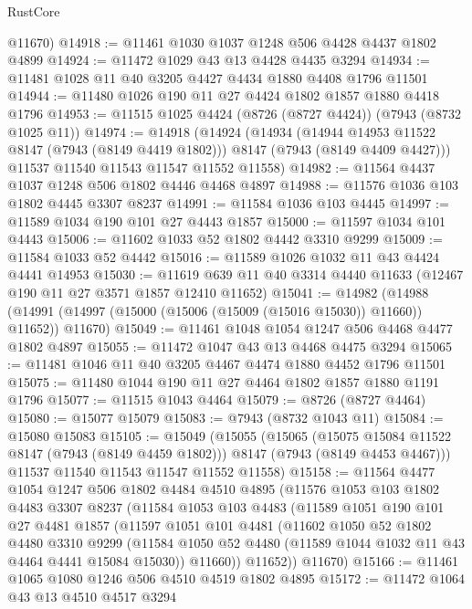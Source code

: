 \begin{lexlean}{RustCore}
\begin{coremodule}
      @11670)
@14918 := @11461 @1030 @1037 @1248 @506 @4428 @4437 @1802 @4899
@14924 := @11472 @1029 @43 @13 @4428 @4435 @3294
@14934 := @11481 @1028 @11 @40 @3205 @4427 @4434 @1880 @4408 @1796 @11501
@14944 := @11480 @1026 @190 @11 @27 @4424 @1802 @1857 @1880 @4418 @1796
@14953 := @11515 @1025 @4424 (@8726 (@8727 @4424)) (@7943 (@8732 @1025 @11))
@14974 := @14918
    (@14924
      (@14934
        (@14944 @14953 @11522 @8147 (@7943 (@8149 @4419 @1802)))
        @8147
        (@7943 (@8149 @4409 @4427)))
      @11537
      @11540
      @11543
      @11547
      @11552
      @11558)
@14982 := @11564 @4437 @1037 @1248 @506 @1802 @4446 @4468 @4897
@14988 := @11576 @1036 @103 @1802 @4445 @3307 @8237
@14991 := @11584 @1036 @103 @4445
@14997 := @11589 @1034 @190 @101 @27 @4443 @1857
@15000 := @11597 @1034 @101 @4443
@15006 := @11602 @1033 @52 @1802 @4442 @3310 @9299
@15009 := @11584 @1033 @52 @4442
@15016 := @11589 @1026 @1032 @11 @43 @4424 @4441 @14953
@15030 := @11619 @639 @11 @40 @3314 @4440 @11633 (@12467 @190 @11 @27 @3571 @1857 @12410 @11652)
@15041 := @14982
    (@14988 (@14991 (@14997 (@15000 (@15006 (@15009 (@15016 @15030)) @11660)) @11652)) @11670)
@15049 := @11461 @1048 @1054 @1247 @506 @4468 @4477 @1802 @4897
@15055 := @11472 @1047 @43 @13 @4468 @4475 @3294
@15065 := @11481 @1046 @11 @40 @3205 @4467 @4474 @1880 @4452 @1796 @11501
@15075 := @11480 @1044 @190 @11 @27 @4464 @1802 @1857 @1880 @1191 @1796
@15077 := @11515 @1043 @4464
@15079 := @8726 (@8727 @4464)
@15080 := @15077 @15079
@15083 := @7943 (@8732 @1043 @11)
@15084 := @15080 @15083
@15105 := @15049
    (@15055
      (@15065
        (@15075 @15084 @11522 @8147 (@7943 (@8149 @4459 @1802)))
        @8147
        (@7943 (@8149 @4453 @4467)))
      @11537
      @11540
      @11543
      @11547
      @11552
      @11558)
@15158 := @11564
    @4477
    @1054
    @1247
    @506
    @1802
    @4484
    @4510
    @4895
    (@11576
      @1053
      @103
      @1802
      @4483
      @3307
      @8237
      (@11584
        @1053
        @103
        @4483
        (@11589
          @1051
          @190
          @101
          @27
          @4481
          @1857
          (@11597
            @1051
            @101
            @4481
            (@11602
              @1050
              @52
              @1802
              @4480
              @3310
              @9299
              (@11584 @1050 @52 @4480 (@11589 @1044 @1032 @11 @43 @4464 @4441 @15084 @15030))
              @11660))
          @11652))
      @11670)
@15166 := @11461 @1065 @1080 @1246 @506 @4510 @4519 @1802 @4895
@15172 := @11472 @1064 @43 @13 @4510 @4517 @3294

\end{coremodule}
\end{lexlean}
